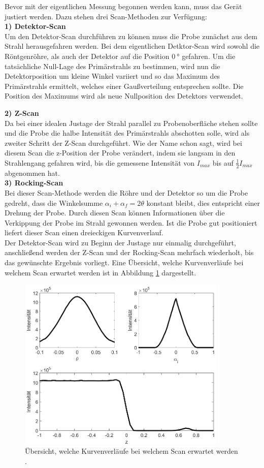 Bevor mit der eigentlichen Messung begonnen werden kann, muss das Gerät justiert werden. Dazu stehen drei Scan-Methoden zur Verfügung:
\\
\textbf{1) Detektor-Scan}\\
Um den Detektor-Scan durchführen zu können muss die Probe zunächst aus dem Strahl herausgefahren werden. Bei dem eigentlichen
Detktor-Scan wird sowohl die Röntgenröhre, als auch der Detektor auf die Position $\SI{0}{\degree}$ gefahren. Um die tatsächliche Null-Lage des
Primärstrahls zu bestimmen, wird nun die Detektorposition um kleine Winkel variiert und so das Maximum des Primärstrahls ermittelt, welches
einer Gaußverteilung entsprechen sollte. Die Position des Maximums wird als neue Nullposition des Detektors verwendet.


\textbf{2) Z-Scan}\\
Da bei einer idealen Justage der Strahl parallel zu Probenoberfläche stehen sollte und die Probe die halbe Intensität des Primärstrahls abschotten solle,
wird als zweiter Schritt der Z-Scan durchgeführt. Wie der Name schon sagt, wird bei diesem Scan die z-Position der Probe verändert, indem sie langsam in den
Strahlengang gefahren wird, bis die gemessene Intensität von $I_{max}$ bis auf $\frac{1}{2}I_{max}$ abgenommen hat.
\\

\textbf{3) Rocking-Scan}\\
Bei dieser Scan-Methode werden die Röhre und der Detektor so um die Probe gedreht, dass die Winkelsumme $\alpha_i + \alpha_f=2\theta$ konstant bleibt, dies entspricht
einer Drehung der Probe. Durch diesen Scan können Informationen über die Verkippung der Probe im Strahl gewonnen werden. Ist die Probe gut positioniert liefert dieser
Scan einen dreieckigen Kurvenverlauf.
\\

Der Detektor-Scan wird zu Beginn der Justage nur einmalig durchgeführt, anschließend werden der Z-Scan und der Rocking-Scan mehrfach wiederholt, bis das gewünschte
Ergebnis vorliegt. Eine Übersicht, welche Kurvenverläufe bei welchem Scan erwartet werden ist in Abbildung \ref{fig:übersicht} dargestellt.

\begin{figure}
  \centering
  \includegraphics[width=10cm]{übersicht.png}
  \caption{Übersicht, welche Kurvenverläufe bei welchem Scan erwartet werden \cite{skript}.}
  \label{fig:übersicht}
\end{figure}


